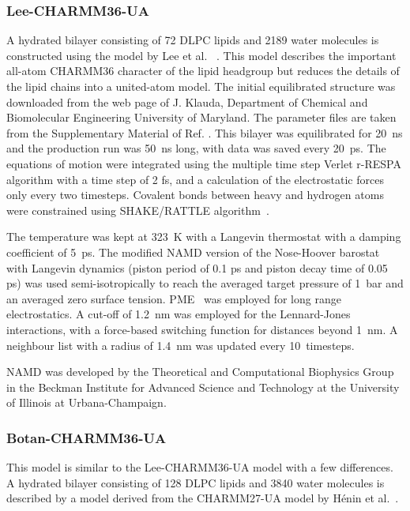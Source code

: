 \documentclass[journal=jacsat,manuscript=article]{achemso}
\begin{document}
\subsubsection{Lee-CHARMM36-UA}
A hydrated bilayer consisting of 72 DLPC lipids and 2189 water molecules
 is constructed using the model by Lee et al. ~\cite{lee14}. This model describes 
 the important all-atom CHARMM36 character of the lipid headgroup but 
reduces the details of the lipid chains into a united-atom model.
The initial  equilibrated structure was downloaded from the web page of J. Klauda, 
Department of Chemical and Biomolecular Engineering University of Maryland.
 The parameter files are taken from the Supplementary Material of Ref. .  
This bilayer was equilibrated for 20~ns and the production run was 50~ns long,  with data was saved every 20~ps. 
 The equations of motion were integrated using the multiple time step Verlet r-RESPA algorithm with
a time step of 2 fs, and a calculation of the electrostatic forces only every two timesteps.
 Covalent bonds between heavy and hydrogen atoms were constrained 
using SHAKE/RATTLE algorithm~\cite{miyamoto92}.

The temperature was kept at 323~K with a Langevin thermostat
with a damping coefficient of 5~ps.  The modified NAMD version of the
Nose-Hoover barostat with Langevin dynamics (piston period of
0.1 ps and piston decay time of 0.05 ps)  was used semi-isotropically 
to reach the averaged target pressure of 1~bar and an averaged zero surface tension.
PME~\cite{darden93,essman95} was employed for long range electrostatics. 
A cut-off of 1.2~nm was employed for  the Lennard-Jones interactions, with 
a force-based switching function  for distances beyond 1~nm.
A neighbour list with a radius of 1.4~nm was updated every 10~timesteps. 

NAMD was developed by the Theoretical and Computational Biophysics Group in the
 Beckman Institute for Advanced Science and Technology at the University
 of Illinois at Urbana-Champaign\cite{phillips05}.

\subsubsection{Botan-CHARMM36-UA}
This model is similar to the Lee-CHARMM36-UA model with a few  differences.
A hydrated bilayer consisting of 128 DLPC lipids and 3840 water
molecules is described by a model derived from the CHARMM27-UA model by H\'enin et al.~\cite{henin08}.
\end{document}
